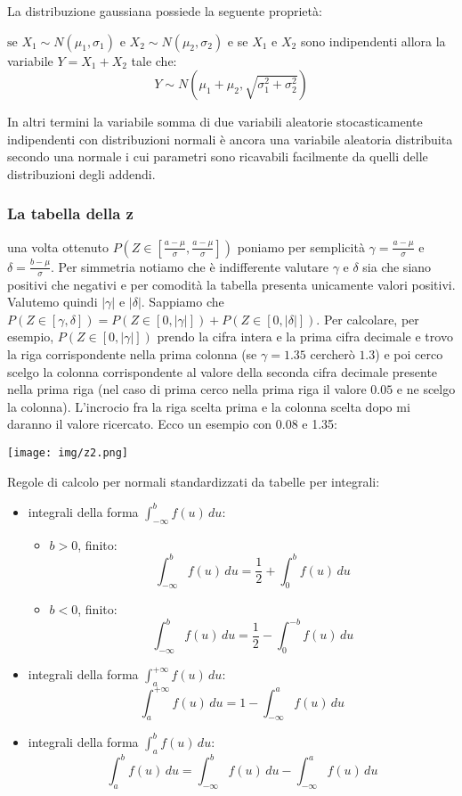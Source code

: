 \documentclass[a4paper,12pt, oneside]{book}
\begin{document}
La distribuzione gaussiana possiede la seguente proprietà:
\begin{definizione}
     $\mbox{se } X_1 \sim N(\mu_1,\sigma_1) \mbox{ e } X_2 \sim N(\mu_2, \sigma_2)$ e se $X_1$ e $X_2$
        sono indipendenti allora la variabile $Y = X_1 + X_2$ tale che:
        \[Y \sim N(\mu_1 + \mu_2, \sqrt{\sigma_1^2 + \sigma_2^2})\]
\end{definizione}
In altri termini la variabile somma di due variabili aleatorie stocasticamente indipendenti con distribuzioni normali
è ancora una variabile aleatoria distribuita secondo una normale i cui parametri sono ricavabili facilmente
da quelli delle distribuzioni degli addendi.
\begin{shaded}
\subsubsection{La tabella della z}
una volta ottenuto $P\left(Z\in\left[\frac{a-\mu}{\sigma},\frac{a-\mu}{\sigma}\right]\right)$ poniamo per semplicità $\gamma= \frac{a-\mu}{\sigma}$ e $\delta=\frac{b-\mu}{\sigma}$. Per simmetria notiamo che è indifferente valutare $\gamma$ e $\delta$ sia che siano positivi che negativi e per comodità la tabella presenta unicamente valori positivi. Valutemo quindi $|\gamma|$ e $|\delta|$. Sappiamo che $P(Z\in[\gamma,\delta])=P(Z\in[0, |\gamma|])+P(Z\in[0,|\delta|])$. Per calcolare, per esempio, $P(Z\in[0, |\gamma|])$ prendo la cifra intera e la prima cifra decimale e trovo la riga corrispondente nella prima colonna (se $\gamma=1.35$ cercherò $1.3$) e poi cerco scelgo la colonna corrispondente al valore della seconda cifra decimale presente nella prima riga (nel caso di prima cerco nella prima riga il valore $0.05$ e ne scelgo la colonna). L'incrocio fra la riga scelta prima e la colonna scelta dopo mi daranno il valore ricercato. Ecco un esempio con 0.08 e 1.35:
\begin{center}
	\texttt{[image: img/z2.png]}
\end{center}
\end{shaded}
\begin{shaded}
Regole di calcolo per normali standardizzati da tabelle per integrali:
\begin{itemize}
	\item integrali della forma $\int_{-\infty}^bf(u)\,du$:
	\begin{itemize}
		\item $b>0$, finito:
			\[\int_{-\infty}^b f(u)\, du= \frac{1}{2}+\int_0^b f(u)\, du\]
		\item $b<0$, finito:
			\[\int_{-\infty}^b f(u)\, du= \frac{1}{2}-\int_0^{-b} f(u)\, du\]
	\end{itemize}
	\item integrali della forma $\int_{a}^{+\infty}f(u)\,du$:
		\[\int_{a}^{+\infty}f(u)\,du= 1-\int_{-\infty}^{a} f(u)\, du\]
	\item integrali della forma $\int_{a}^{b}f(u)\,du$:
		\[\int_{a}^{b}f(u)\,du=\int_{-\infty}^bf(u)\,du-\int_{-\infty}^a f(u)\,du\]
\end{itemize}
\end{shaded}
\end{document}
